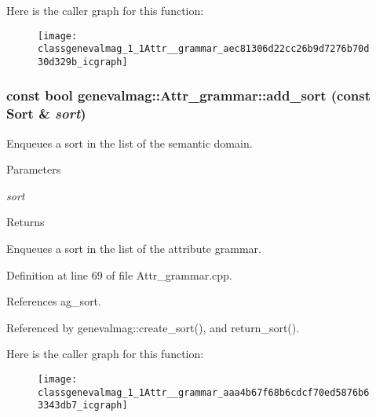 Here is the caller graph for this function:\nopagebreak
\begin{figure}[H]
\begin{center}
\leavevmode
\texttt{[image: classgenevalmag\_1\_1Attr\_\_grammar\_aec81306d22cc26b9d7276b70d30d329b\_icgraph]}
\end{center}
\end{figure}


\hypertarget{classgenevalmag_1_1Attr__grammar_aaa4b67f68b6cdcf70ed5876b63343db7}{
\subsubsection[{add\_\-sort}]{\setlength{\rightskip}{0pt plus 5cm}const bool genevalmag::Attr\_\-grammar::add\_\-sort (const {\bf Sort} \& {\em sort})}}
\label{classgenevalmag_1_1Attr__grammar_aaa4b67f68b6cdcf70ed5876b63343db7}
Enqueues a sort in the list of the semantic domain. 
\begin{DoxyParams}{Parameters}
\item[{\em sort}]\end{DoxyParams}
\begin{DoxyReturn}{Returns}

\end{DoxyReturn}
Enqueues a sort in the list of the attribute grammar. 

Definition at line 69 of file Attr\_\-grammar.cpp.



References ag\_\-sort.



Referenced by genevalmag::create\_\-sort(), and return\_\-sort().



Here is the caller graph for this function:\nopagebreak
\begin{figure}[H]
\begin{center}
\leavevmode
\texttt{[image: classgenevalmag\_1\_1Attr\_\_grammar\_aaa4b67f68b6cdcf70ed5876b63343db7\_icgraph]}
\end{center}
\end{figure}


